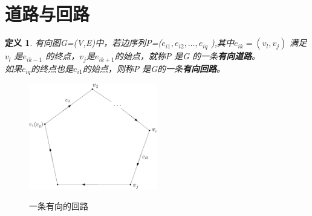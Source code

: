 \documentclass[11pt,a4paper,openany]{book}
\newtheorem{defination}{\textbf{定义}}[section]
\begin{document}
\section{道路与回路}
\begin{defination}\K 有向图G=(V,E)中，若边序列P=($e_{i1},e_{i2},\dots,e_{iq}$ ),其中$e_{ik}=(v_l,v_j )$ 满足$v_l$ 是$e_{ik-1}$ 的终点，$v_j$是$e_{ik+1}$的始点，就称P 是G 的一条\textbf{有向道路}。\\ 如果$e_{iq}$的终点也是$e_{i1}$的始点，则称P 是G的一条\textbf{有向回路}。
\end{defination}
\begin{figure}[H]
  \centering
  \includegraphics[width=0.5\textwidth]{2.1.1.png}\\
  \caption*{一条有向的回路}
\end{figure}
\end{document}
